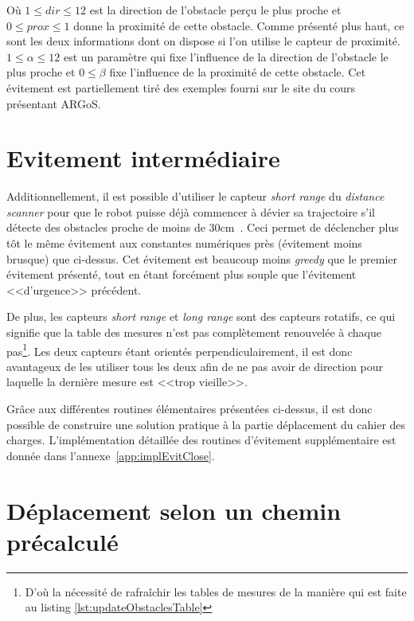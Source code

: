 Où $ 1 \leq dir \leq 12 $ est la direction de l'obstacle perçu le plus proche et \hbox{$0 \leq prox \leq 1$} donne la proximité de cette obstacle. Comme présenté plus haut, ce sont les deux informations dont on dispose si l'on utilise le capteur de proximité.  \(1 \leq \alpha \leq 12 \) est un paramètre qui fixe l'influence de la direction de l'obstacle le plus proche et \(0 \leq \beta \) fixe l'influence de la proximité de cette obstacle. Cet évitement est partiellement tiré des exemples fourni sur le site du cours présentant ARGoS.~\cite{argosSite1}

\section{Evitement intermédiaire}

Additionnellement, il est possible d'utiliser le capteur \emph{short range} du \emph{distance scanner} pour que le robot puisse déjà commencer à dévier sa trajectoire s'il détecte des obstacles proche de moins de 30cm~\cite{argosSite1}. Ceci permet de déclencher plus tôt le même évitement aux constantes numériques près (évitement moins brusque) que ci-dessus. Cet évitement est beaucoup moins \emph{greedy} que le premier évitement présenté, tout en étant forcément plus souple que l'évitement <<d'urgence>> précédent.

De plus, les capteurs \emph{short range} et \emph{long range} sont des capteurs rotatifs, ce qui signifie que la table des mesures n'est pas complètement renouvelée à chaque pas\footnote{D'où la nécessité de rafraîchir les tables de mesures de la manière qui est faite au listing \ref{lst:updateObstaclesTable}}. Les deux capteurs étant orientés perpendiculairement, il est donc avantageux de les utiliser tous les deux afin de ne pas avoir de direction pour laquelle la dernière mesure est <<trop vieille>>.

Grâce aux différentes routines élémentaires présentées ci-dessus, il est donc possible de construire une solution pratique à la partie déplacement du cahier des charges. L'implémentation détaillée des routines d'évitement supplémentaire est donnée dans l'annexe~\ref{app:implEvitClose}.

\section{Déplacement selon un chemin précalculé}

